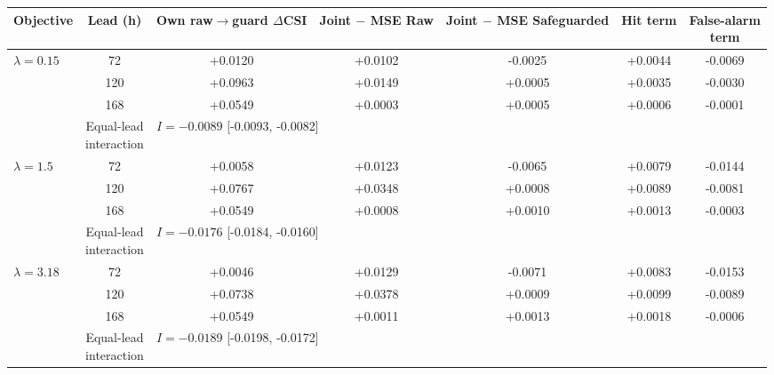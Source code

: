 \begin{tabular}{lcccccc}
\hline
Objective & Lead (h) & \shortstack{Own raw$\to$guard\\$\Delta$CSI} & \shortstack{Joint $-$ MSE\\Raw} & \shortstack{Joint $-$ MSE\\Safeguarded} & Hit term & \shortstack{False-alarm\\term} \\
\hline
$\lambda=0.15$ & 72 & +0.0120 & +0.0102 & -0.0025 & +0.0044 & -0.0069 \\
 & 120 & +0.0963 & +0.0149 & +0.0005 & +0.0035 & -0.0030 \\
 & 168 & +0.0549 & +0.0003 & +0.0005 & +0.0006 & -0.0001 \\
 & \shortstack{Equal-lead\\interaction} & \multicolumn{5}{l}{$I = -0.0089$ [-0.0093, -0.0082]} \\[5pt]
$\lambda=1.5$ & 72 & +0.0058 & +0.0123 & -0.0065 & +0.0079 & -0.0144 \\
 & 120 & +0.0767 & +0.0348 & +0.0008 & +0.0089 & -0.0081 \\
 & 168 & +0.0549 & +0.0008 & +0.0010 & +0.0013 & -0.0003 \\
 & \shortstack{Equal-lead\\interaction} & \multicolumn{5}{l}{$I = -0.0176$ [-0.0184, -0.0160]} \\[5pt]
$\lambda=3.18$ & 72 & +0.0046 & +0.0129 & -0.0071 & +0.0083 & -0.0153 \\
 & 120 & +0.0738 & +0.0378 & +0.0009 & +0.0099 & -0.0089 \\
 & 168 & +0.0549 & +0.0011 & +0.0013 & +0.0018 & -0.0006 \\
 & \shortstack{Equal-lead\\interaction} & \multicolumn{5}{l}{$I = -0.0189$ [-0.0198, -0.0172]} \\
\hline
\end{tabular}
